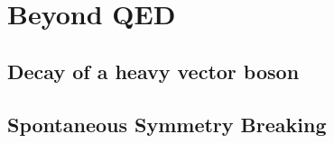 \documentclass[main.tex]{subfiles}
\begin{document}
\chapter{Beyond QED}

\section{Decay of a heavy vector boson}


\section{Spontaneous Symmetry Breaking}
\end{document}
